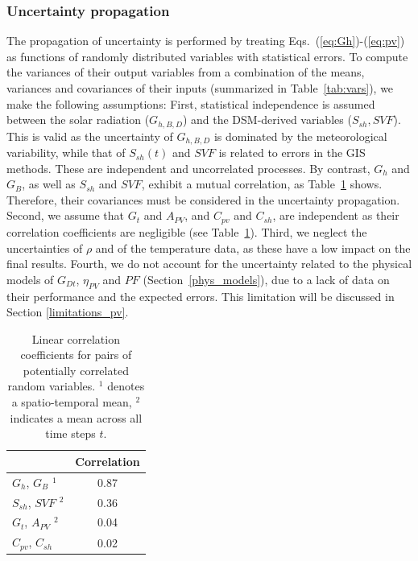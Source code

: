 \subsubsection{Uncertainty propagation}
\label{unc_prop}

The propagation of uncertainty is performed by treating Eqs.~(\ref{eq:Gh})-(\ref{eq:pv}) as functions of randomly distributed variables with statistical errors. 
To compute the variances of their output variables from a combination of the means, variances and covariances of their inputs (summarized in Table~\ref{tab:vars}), we make the following assumptions:
First, statistical independence is assumed between the solar radiation ($G_{h, B, D}$) and the DSM-derived variables ($S_{sh}, \mathit{SVF}$). 
This is valid as the uncertainty of $G_{h, B, D}$ is dominated by the meteorological variability, while that of $S_{sh}(t)$ and $\mathit{SVF}$ is related to errors in the GIS methods. These are independent and uncorrelated processes. 
By contrast, $G_h$ and $G_B$, as well as $S_{sh}$ and $\mathit{SVF}$, exhibit a mutual correlation, as Table~\ref{tab:covrr} shows. Therefore, their covariances must be considered in the uncertainty propagation. 
Second, we assume that $G_t$ and $A_{PV}$, and $C_{\mathit{pv}}$ and $C_{sh}$, are independent as their correlation coefficients are negligible (see Table~\ref{tab:covrr}).
Third, we neglect the uncertainties of $\rho$ and of the temperature data, as these have a low impact on the final results.
Fourth, we do not account for the uncertainty related to the physical models of $G_{Dt}$, $\eta_{PV}$ and $\mathit{PF}$ (Section~\ref{phys_models}), due to a lack of data on their performance and the expected errors. This limitation will be discussed in Section \ref{limitations_pv}.

\begin{table}[tb]
\centering
\footnotesize
\caption{Linear correlation coefficients for pairs of potentially correlated random variables. $^1$ denotes a spatio-temporal mean, $^2$ indicates a mean across all time steps $t$.}
\label{tab:covrr}
\begin{tabular}{lc}
    \hline
                        & \textbf{Correlation}  \\ \hline
    $G_h$, $G_B$ $^1$    & 0.87                  \\
    $S_{sh}$, $\mathit{SVF}$ $^2$  & 0.36                  \\ 
    $G_t$, $A_{PV}$ $^2$  & 0.04                  \\
    $C_{\mathit{pv}}$, $C_{sh}$    & 0.02                  \\   \hline 
\end{tabular}
\end{table}

